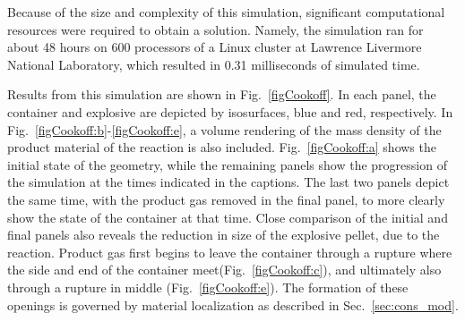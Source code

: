 Because of the size and complexity of this simulation, significant
computational resources were required to obtain a solution.  Namely,
the simulation ran for about 48 hours on 600 processors of a Linux
cluster at Lawrence Livermore National Laboratory, which resulted in
0.31 milliseconds of simulated time.

Results from this simulation are shown in Fig.~\ref{figCookoff}.  In
each panel, the container and explosive are depicted by isosurfaces,
blue and red, respectively.  In Fig.~\ref{figCookoff:b}-\ref{figCookoff:e},
a volume rendering of the mass density of the product material of the
reaction is also included.  Fig.~\ref{figCookoff:a} shows the initial
state of the geometry, while the remaining panels show the progression
of the simulation at the times indicated in the captions.  The last
two panels depict the same time, with the product gas removed in the
final panel, to more clearly show the state of the container at that
time.  Close comparison of the initial and final panels also reveals
the reduction in size of the explosive pellet, due to the reaction.
Product gas first begins to leave the container through a
rupture where the side and end of the container
meet(Fig.~\ref{figCookoff:c}), and ultimately
also through a rupture in middle (Fig.~\ref{figCookoff:e}).  The
formation of these openings is governed by material localization as
described in Sec.~\ref{sec:cons_mod}.


